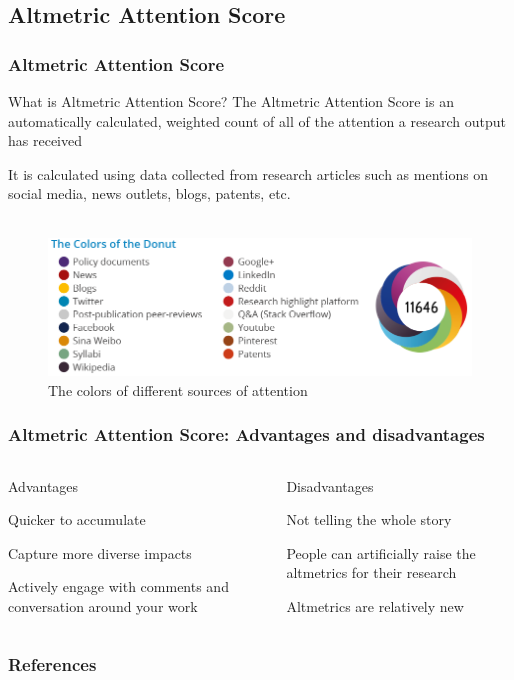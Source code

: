 \documentclass{beamer}
\begin{document}
\subsection{Altmetric Attention Score}
\begin{frame}
    \frametitle{Altmetric Attention Score}
    \begin{block}{What is Altmetric Attention Score?}
       The Altmetric Attention Score is an automatically calculated, weighted count of all of the attention a research output has received
    \end{block}

    It is calculated using data collected from research articles such as mentions
    on social media, news outlets, blogs, patents, etc.\\~\

    \begin{figure}[h]
        \includegraphics[height=0.41\textheight]{2.png}
        \caption{The colors of different sources of attention}
    \end{figure}
\end{frame}
\begin{frame}
    \frametitle{Altmetric Attention Score: Advantages and disadvantages}
    \begin{columns}[T]
        \begin{column}{.5\textwidth}
            \centering Advantages
            \begin{propslist}
                \item Quicker to accumulate \pause
                \item Capture more diverse impacts  \pause
                \item Actively engage with comments and conversation around your work \pause
            \end{propslist}
        \end{column}
        \begin{column}{.5\textwidth}
            \centering Disadvantages %
            \begin{conslist}
                \item Not telling the whole story \pause
                \item People can artificially raise the altmetrics for their research \pause
                \item Altmetrics are relatively new 
            \end{conslist}
        \end{column}
    \end{columns}
\end{frame}

\begin{frame}[allowframebreaks]
    \frametitle{References}

    
    

\end{frame}
\end{document}
